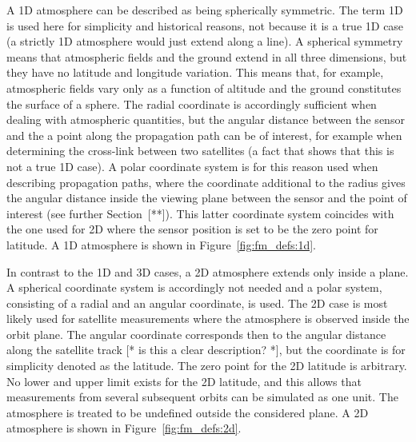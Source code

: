  A 1D atmosphere can be described as being
spherically symmetric. The term 1D is used here for simplicity and
historical reasons, not because it is a true 1D case (a strictly 1D
atmosphere would just extend along a line). A spherical symmetry means
that atmospheric fields and the ground extend in all three dimensions,
but they have no latitude and longitude variation. This means that,
for example, atmospheric fields vary only as a function of altitude
and the ground constitutes the surface of a sphere. The radial
coordinate is accordingly sufficient when dealing with atmospheric
quantities, but the angular distance between the sensor and the a
point along the propagation path can be of interest, for example when
determining the cross-link between two satellites (a fact that shows
that this is not a true 1D case). A polar coordinate system is for
this reason used when describing propagation paths, where the
coordinate additional to the radius gives the angular distance inside
the viewing plane between the sensor and the point of interest
(see further Section~[**]).  This latter coordinate system coincides
with the one used for 2D where the sensor position is set to be the
zero point for latitude. A 1D atmosphere is shown in
Figure~\ref{fig:fm_defs:1d}.

 In contrast to the 1D and 3D cases, a 2D
atmosphere extends only inside a plane. A spherical coordinate system
is accordingly not needed and a polar system, consisting of a radial
and an angular coordinate, is used. The 2D case is most likely used
for satellite measurements where the atmosphere is observed inside the
orbit plane. The angular coordinate corresponds then to the angular
distance along the satellite track [* is this a clear description?
*], but the coordinate is for simplicity denoted as the latitude. The
zero point for the 2D latitude is arbitrary. No lower and upper limit
exists for the 2D latitude, and this allows that measurements from
several subsequent orbits can be simulated as one unit. The atmosphere
is treated to be undefined outside the considered plane. A 2D
atmosphere is shown in Figure~\ref{fig:fm_defs:2d}.

